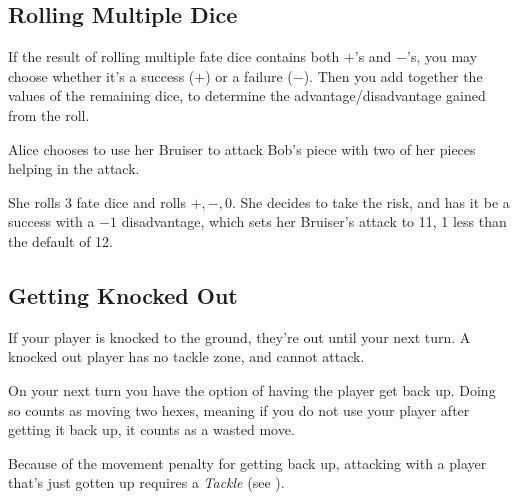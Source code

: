 \subsection{Rolling Multiple Dice}\label{sec:multidice} If the result of rolling multiple fate dice contains both $+$'s and $-$'s, you may choose whether it's a success ($+$) or a failure ($-$).
Then you add together the values of the remaining dice, to determine the advantage/disadvantage gained from the roll.

\begin{example}
    Alice chooses to use her Bruiser to attack Bob's piece with two of her pieces helping in the attack.
\end{example}
She rolls 3 fate dice and rolls $+, -, 0$.
She decides to take the risk, and has it be a success with a $-1$ disadvantage, which sets her Bruiser's attack to 11, 1 less than the default of 12.

\subsection{Getting Knocked Out}\label{sec:knockout}
If your player is knocked to the ground, they're out until your next turn.
A knocked out player has no tackle zone, and cannot attack.

On your next turn you have the option of having the player get back up.
Doing so counts as moving two hexes, meaning if you do not use your player after getting it back up, it counts as a wasted move.

\begin{note} 
Because of the movement penalty for getting back up, attacking with a player that's just gotten up requires a \textit{Tackle} (see ).
\end{note}